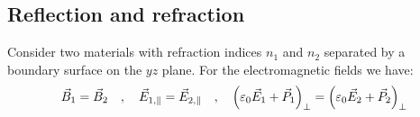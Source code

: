 \subsection{Reflection and refraction}

Consider two materials with refraction indices $n_1$ and $n_2$ separated by a
boundary surface on the $yz$ plane. For the electromagnetic fields we have:
\begin{align*}
    \vec{B}_1 = \vec{B}_2
    \hspace{10pt} , \hspace{10pt}
    \vec{E}_{1,\parallel} = \vec{E}_{2,\parallel}
    \hspace{10pt} , \hspace{10pt}
    \left( \varepsilon_0 \vec{E}_1 + \vec{P}_1 \right)_\perp = \left( \varepsilon_0 \vec{E}_2 + \vec{P}_2 \right)_{\perp}
\end{align*}


